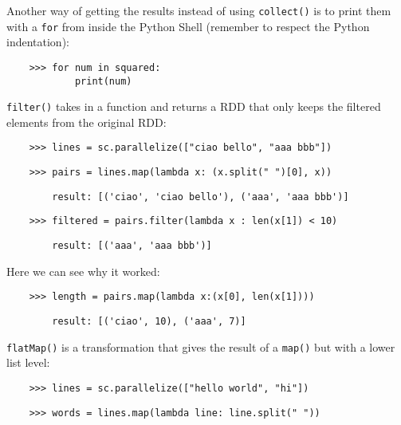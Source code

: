 Another way of getting the results instead of using \texttt{collect()} is to print them with a \texttt{for} from inside the Python Shell (remember to respect the Python indentation):

\begin{lstlisting}
    >>> for num in squared:
            print(num)
\end{lstlisting}

\texttt{filter()} takes in a function and returns a RDD that only keeps the filtered elements from the original RDD:

\begin{lstlisting}
    >>> lines = sc.parallelize(["ciao bello", "aaa bbb"])
\end{lstlisting}

\begin{lstlisting}
    >>> pairs = lines.map(lambda x: (x.split(" ")[0], x))
\end{lstlisting}

\begin{lstlisting}
        result: [('ciao', 'ciao bello'), ('aaa', 'aaa bbb')]
\end{lstlisting}

\begin{lstlisting}
    >>> filtered = pairs.filter(lambda x : len(x[1]) < 10)
\end{lstlisting}

\begin{lstlisting}
        result: [('aaa', 'aaa bbb')]
\end{lstlisting}

Here we can see why it worked:

\begin{lstlisting}
    >>> length = pairs.map(lambda x:(x[0], len(x[1])))
\end{lstlisting}

\begin{lstlisting}
        result: [('ciao', 10), ('aaa', 7)]
\end{lstlisting}


\texttt{flatMap()} is a transformation that gives the result of a \texttt{map()} but with a lower list level:

\begin{lstlisting}
    >>> lines = sc.parallelize(["hello world", "hi"])
\end{lstlisting}

\begin{lstlisting}
    >>> words = lines.map(lambda line: line.split(" "))
\end{lstlisting}

